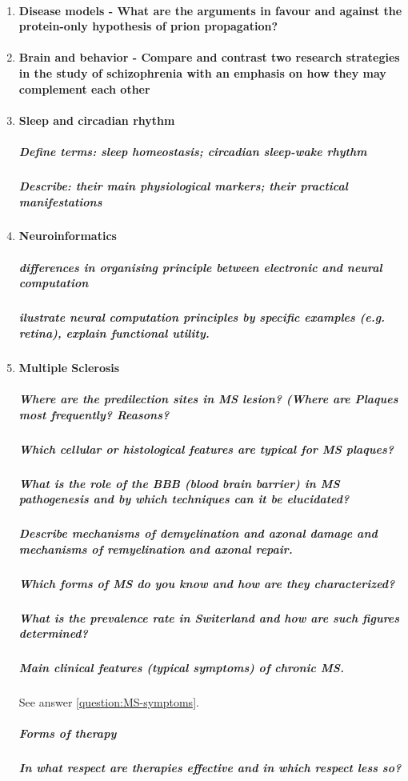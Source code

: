 \documentclass[12pt,article,oneside,a4paper]{memoir}
\begin{document}
\begin{enumerate}
\item \paragraph{Disease models - What are the arguments in favour and against the protein-only hypothesis of prion propagation?}
\item \paragraph{Brain and behavior - Compare and contrast two research strategies in the study of schizophrenia with an emphasis on how they may complement each other}
\item \paragraph{Sleep and circadian rhythm}
\subparagraph{Define terms: sleep homeostasis; circadian sleep-wake rhythm}
\subparagraph{Describe: their main physiological markers; their practical manifestations}
\item \paragraph{Neuroinformatics}
\subparagraph{differences in organising principle between electronic and neural computation}
\subparagraph{ilustrate neural computation principles by specific examples (e.g. retina), explain functional utility.}
\item \paragraph{Multiple Sclerosis}
\subparagraph{Where are the predilection sites in MS lesion? (Where are Plaques most frequently? Reasons?}
\subparagraph{Which cellular or histological features are typical for MS plaques?}
\subparagraph{What is the role of the BBB (blood brain barrier) in MS pathogenesis and by which techniques can it be elucidated?}
\subparagraph{Describe mechanisms of demyelination and axonal damage and mechanisms of remyelination and axonal repair.}
\subparagraph{Which forms of MS do you know and how are they characterized?}
\subparagraph{What is the prevalence rate in Switerland and how are such figures determined?}
\subparagraph{Main clinical features (typical symptoms) of chronic MS.} See answer \ref{question:MS-symptoms}.
\subparagraph{Forms of therapy}
\subparagraph{In what respect are therapies effective and in which respect less so?}
\end{enumerate}
\end{document}
